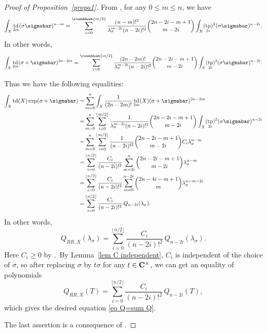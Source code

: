 \documentclass[12pt]{amsart}
\def\C{{\bf C}}
\DeclareMathOperator{\td}{td}
\DeclareMathOperator{\tp}{tp}
\theoremstyle{remark}
\begin{document}
\begin{proof}[Proof of Proposition~\ref{propa1}]
From \cite[Proof of Theorem~5.1]{jia}, for any $0\leq m\leq n$, we have \begin{align*}
 \int_X\td_{2m}(\sigma\sigmabar)^{n-m} 
= \sum_{i=0}^{\rounddown{m/2}} \frac{(n-m)!^2}{\lambda_\sigma^{m-2i} (n-2i)!^2}\binom{2n-2i-m+1}{m-2i}\int_X(\tp_{2i})^2(\sigma\sigmabar)^{n-2i}.
\end{align*}
In other words, 
\begin{align*}
 \int_X\td_{2m}(\sigma+\sigmabar)^{2n-2m} 
= \sum_{i=0}^{\rounddown{m/2}} \frac{(2n-2m)!}{\lambda_\sigma^{m-2i} (n-2i)!^2}\binom{2n-2i-m+1}{m-2i}\int_X(\tp_{2i})^2(\sigma\sigmabar)^{n-2i}.
\end{align*}

Thus we have the following equalities:
 \begin{align*}
\int_X \td(X) \exp(\sigma+\sigmabar)
 =&\sum_{m=0}^n\int_X  \frac{1}{(2n-2m)!}\td_{2m}(X) (\sigma+\sigmabar)^{2n-2m}\\
 =&\sum_{m=0}^n\sum_{i=0}^{\lfloor m/2\rfloor}\frac{1}{\lambda_\sigma^{m-2i}(n-2i)!^2}\binom{2n-2i-m+1}{m-2i}\int_X (\tp_{2i})^2(\sigma\sigmabar)^{n-2i}\\
 =&\sum_{m=0}^n\sum_{i=0}^{\lfloor m/2\rfloor}\frac{1}{(n-2i)!^2}\binom{2n-2i-m+1}{m-2i}C_i \lambda_\sigma^{n-m}\\
=&\sum_{i=0}^{\lfloor n/2\rfloor}\frac{C_i}{(n-2i)!^2} \sum_{m=2i}^n\binom{2n-2i-m+1}{m-2i}\lambda_\sigma^{n-m}\\
=&\sum_{i=0}^{\lfloor n/2\rfloor}\frac{C_i}{(n-2i)!^2} \sum_{m=0}^{n-2i}\binom{2n-4i-m+1}{m}\lambda_\sigma^{n-m-2i}\\
=&\sum_{i=0}^{\lfloor n/2\rfloor}\frac{C_i}{(n-2i)!^2} \,Q_{n-2i}(\lambda_\sigma).
\end{align*}
In other words,  
$$ Q_{RR, X}(\lambda_\sigma)=\sum_{i=0}^{\lfloor n/2\rfloor}\frac{C_i}{(n-2i)!^2} \,Q_{n-2i}(\lambda_\sigma).
$$
Here  $C_i\geq 0$ by \cite[Corollary~4.4]{jia}.\ 
By Lemma~\ref{lem C independent}, $C_i$ is independent of the choice of $\sigma$, so after replacing $\sigma$ by $t\sigma$ for any $t\in \C^\times$, we can get an equality of polynomials 
$$ Q_{RR, X}(T)=\sum_{i=0}^{\lfloor n/2\rfloor}\frac{C_i}{(n-2i)!^2}\, Q_{n-2i}(T),
$$
which gives  the desired equation \eqref{eq Q=sum Q}.

The last assertion is a consequence of \cite[Corollary~5.2]{jia}.
\end{proof}
\end{document}
